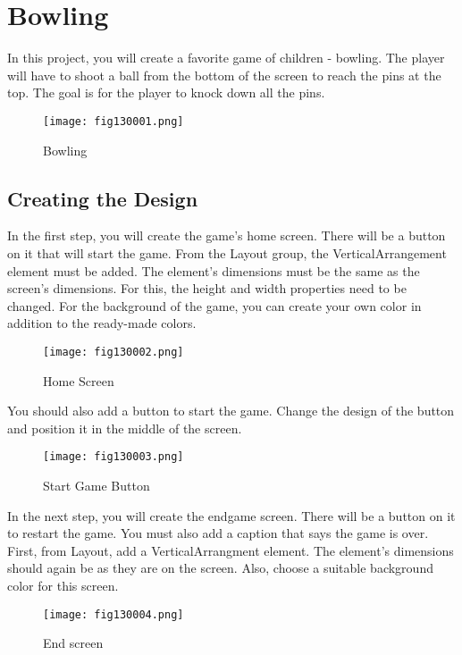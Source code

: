 \chapter{Bowling}

In this project, you will create a favorite game of children - bowling. The player will have to shoot a ball from the bottom of the screen to reach the pins at the top. The goal is for the player to knock down all the pins.

\begin{figure}[H]
   \centering
   \texttt{[image: fig130001.png]}
   \caption{Bowling}
\label{fig130001}
\end{figure}

\section{Creating the Design}

In the first step, you will create the game's home screen. There will be a button on it that will start the game. From the Layout group, the VerticalArrangement element must be added. The element's dimensions must be the same as the screen's dimensions. For this, the height and width properties need to be changed. For the background of the game, you can create your own color in addition to the ready-made colors.

\begin{figure}[H]
   \centering
   \texttt{[image: fig130002.png]}
   \caption{Home Screen}
\label{fig130002}
\end{figure}

You should also add a button to start the game. Change the design of the button and position it in the middle of the screen.

\begin{figure}[H]
   \centering
   \texttt{[image: fig130003.png]}
   \caption{Start Game Button}
\label{fig130003}
\end{figure}

In the next step, you will create the endgame screen. There will be a button on it to restart the game. You must also add a caption that says the game is over. First, from Layout, add a VerticalArrangment element. The element's dimensions should again be as they are on the screen. Also, choose a suitable background color for this screen.

\begin{figure}[H]
   \centering
   \texttt{[image: fig130004.png]}
   \caption{End screen}
\label{fig130004}
\end{figure}

